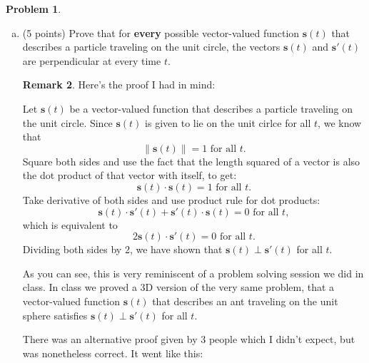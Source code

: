 \documentclass[11pt,oneside]{amsart}
\theoremstyle{definition}
\newtheorem{problem}{Problem}
\newtheorem*{remark}{Remark}
\theoremstyle{plain}
\newcommand{\bs}{{\mathbf{s}}}
\begin{document}
\begin{problem}
\begin{enumerate}[(a)]
\begin{remark}
\begin{itemize}
      \end{itemize}
      People generally did well in showing (ii), the non-constancy of the speed. Errors there include only showing that the components are not constant, which is not sufficient; indeed, the original $(\cos(t),\sin(t))$ has constant speed despite the fact that the components are not constant.
    \end{remark}
    \vfill
    \item (5 points) Prove that for \textbf{every} possible vector-valued function $\bs(t)$ that describes a particle traveling on the unit circle, the vectors $\bs(t)$ and $\bs'(t)$ are perpendicular at every time $t$.
    \begin{remark}\color{blue}
      Here's the proof I had in mind:

      Let $\bs(t)$ be a vector-valued function that describes a particle traveling on the unit circle. Since $\bs(t)$ is given to lie on the unit cirlce for all $t$, we know that
      \[\|\bs(t)\|=1\text{ for all }t.\]
      Square both sides and use the fact that the length squared of a vector is also the dot product of that vector with itself, to get:
      \[\bs(t)\cdot\bs(t)=1\text{ for all }t.\]
      Take derivative of both sides and use product rule for dot products:
      \[\bs(t)\cdot\bs'(t)+\bs'(t)\cdot\bs(t)=0\text{ for all }t,\]
      which is equivalent to
      \[2\bs(t)\cdot\bs'(t)=0\text{ for all }t.\]
      Dividing both sides by 2, we have shown that $\bs(t)\perp\bs'(t)$ for all $t$.

      As you can see, this is very reminiscent of a problem solving session we did in class. In class we proved a 3D version of the very same problem, that a vector-valued function $\bs(t)$ that describes an ant traveling on the unit sphere satisfies $\bs(t)\perp\bs'(t)$ for all $t$.

      There was an alternative proof given by 3 people which I didn't expect, but was nonetheless correct. It went like this:


\end{remark}
\end{enumerate}
\end{problem}
\end{document}
